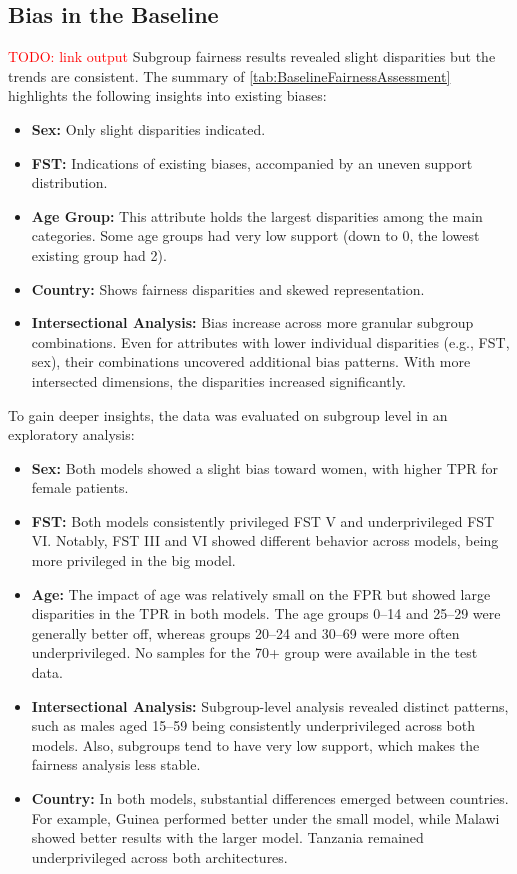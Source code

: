 \documentclass[12pt, a4paper, oneside]{book}   	%
\renewcommand{\todo}[1]{\textcolor{red}{TODO: #1}}
\begin{document}
		\subsection{Bias in the Baseline}
		\todo{link output}
		Subgroup fairness results revealed slight disparities but the trends are consistent. The summary of \autoref{tab:BaselineFairnessAssessment} highlights the following insights into existing biases:
		\begin{itemize}
			\item \textbf{Sex:} Only slight disparities indicated.
			\item \textbf{\gls{FST}:} Indications of existing biases, accompanied by an uneven support distribution.
   			\item \textbf{Age Group:} This attribute holds the largest disparities among the main categories. Some age groups had very low support (down to 0, the lowest existing group had 2).
			\item \textbf{Country:} Shows fairness disparities and skewed representation.
	    	\item \textbf{Intersectional Analysis:} Bias increase across more granular subgroup combinations. Even for attributes with lower individual disparities (e.g., \gls{FST}, sex), their combinations uncovered additional bias patterns. With more intersected dimensions, the disparities increased significantly.
		\end{itemize}
		
		To gain deeper insights, the data was evaluated on subgroup level in an exploratory analysis:
		\begin{itemize}
			\item \textbf{Sex:} Both models showed a slight bias toward women, with higher \gls{TPR} for female patients.
			\item \textbf{\gls{FST}:} Both models consistently privileged \gls{FST} V and underprivileged \gls{FST} VI. Notably, \gls{FST} III and VI showed different behavior across models, being more privileged in the big model.
			\item \textbf{Age:} The impact of age was relatively small on the \gls{FPR} but showed large disparities in the \gls{TPR} in both models. The age groups 0–14 and 25–29 were generally better off, whereas groups 20–24 and 30–69 were more often underprivileged. No samples for the 70+ group were available in the test data.
			\item \textbf{Intersectional Analysis:} Subgroup-level analysis revealed distinct patterns, such as males aged 15–59 being consistently underprivileged across both models. Also, subgroups tend to have very low support, which makes the fairness analysis less stable.
			\item \textbf{Country:} In both models, substantial differences emerged between countries. For example, Guinea performed better under the small model, while Malawi showed better results with the larger model. Tanzania remained underprivileged across both architectures.
		\end{itemize}
		
\end{document}

